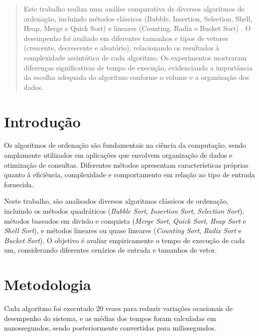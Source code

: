 \documentclass[
	article,			%
	11pt,				%
	oneside,			%
	a4paper,			%
	english,			%
	brazil,				%
	sumario=tradicional
	]{abntex2}
\begin{document}
\frenchspacing 



\maketitle

\begin{abstract}
Este trabalho realiza uma análise comparativa de diversos algoritmos de ordenação, incluindo métodos clássicos (Bubble, Insertion, Selection, Shell, Heap, Merge e Quick Sort) e lineares (Counting, Radix e Bucket Sort) \cite{devmedia_algoritmos_ordenacao_java}. O desempenho foi avaliado em diferentes tamanhos e tipos de vetores (crescente, decrescente e aleatório), relacionando os resultados à complexidade assintótica de cada algoritmo. Os experimentos mostraram diferenças significativas de tempo de execução, evidenciando a importância da escolha adequada do algoritmo conforme o volume e a organização dos dados.
\end{abstract}

\section{Introdução}
Os algoritmos de ordenação são fundamentais na ciência da computação, sendo amplamente utilizados em aplicações que envolvem organização de dados e otimização de consultas. Diferentes métodos apresentam características próprias quanto à eficiência, complexidade e comportamento em relação ao tipo de entrada fornecida.

Neste trabalho, são analisados diversos algoritmos clássicos de ordenação, incluindo os métodos quadráticos (\textit{Bubble Sort}, \textit{Insertion Sort}, \textit{Selection Sort}), métodos baseados em divisão e conquista (\textit{Merge Sort}, \textit{Quick Sort}, \textit{Heap Sort} e \textit{Shell Sort}), e métodos lineares ou quase lineares (\textit{Counting Sort}, \textit{Radix Sort} e \textit{Bucket Sort}). O objetivo é avaliar empiricamente o tempo de execução de cada um, considerando diferentes cenários de entrada e tamanhos de vetor.
\cite{unipampa_algoritmos_classificacao_dados}

\section{Metodologia}
Cada algoritmo foi executado 20 vezes para reduzir variações ocasionais de desempenho do sistema, e as médias dos tempos foram calculadas em nanossegundos, sendo posteriormente convertidas para milissegundos.
\end{document}
